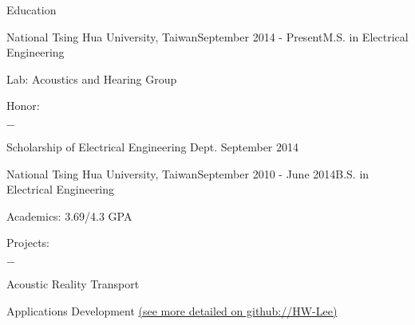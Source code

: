 \documentclass{resume} %
\begin{document}

\begin{rSection}{Education}

\begin{rSubsection}{National Tsing Hua University, Taiwan}{September 2014 - Present}{M.S. in Electrical Engineering}{}
\item Lab: Acoustics and Hearing Group
\item Honor:
	\begin{cvItemize}{$-$}
		\item Scholarship of Electrical Engineering Dept. \hfill September 2014
	\end{cvItemize}
\end{rSubsection}

\begin{rSubsection}{National Tsing Hua University, Taiwan}{September 2010 - June 2014}{B.S. in Electrical Engineering}{}
\item Academics: 3.69/4.3 GPA
\item Projects:
	\begin{cvItemize}{$-$}
		\item Acoustic Reality Transport
		\item Applications Development \href{https://github.com/HW-Lee}{(see more detailed on github://HW-Lee)}
	\end{cvItemize}
\end{rSubsection}

\end{rSection}

\end{document}
